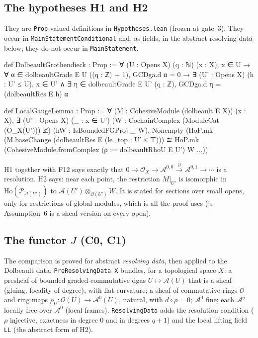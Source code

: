 \documentclass[11pt,a4paper]{article}
\newcommand{\code}[1]{\texttt{#1}}
\newcommand{\cA}{\mathcal{A}}
\newcommand{\Ocal}{\mathcal{O}}
\newcommand{\dbar}{\bar\partial}
\newcommand{\Ho}{\mathrm{Ho}}
\begin{document}
\subsection{The hypotheses H1 and H2}\label{sec:hyp}
They are \code{Prop}-valued definitions in \code{Hypotheses.lean} (frozen at gate~3). They occur
in \code{MainStatementConditional} and, as fields, in the abstract resolving data below; they do
not occur in \code{MainStatement}.
\begin{lean}
def DolbeaultGrothendieck : Prop :=
  ∀ (U : Opens X) (q : ℕ) (x : X), x ∈ U →
    ∀ α ∈ dolbeaultGrade E U ((q : ℤ) + 1), GCDga.d α = 0 →
      ∃ (U' : Opens X) (h : U' ≤ U), x ∈ U' ∧
        ∃ η ∈ dolbeaultGrade E U' (q : ℤ), GCDga.d η = (dolbeaultRes E h) α

def LocalGaugeLemma : Prop :=
  ∀ (M : CohesiveModule (dolbeault E X)) (x : X),
    ∃ (U' : Opens X) (_ : x ∈ U')
      (W : CochainComplex (ModuleCat (O_X(U'))) ℤ) (hW : IsBoundedFGProj _ W),
      Nonempty (HoP.mk (M.baseChange (dolbeaultRes E (le_top : U' ≤ ⊤))) ≅
                HoP.mk (CohesiveModule.fromComplex (ρ := dolbeaultRhoU E U') W ...))
\end{lean}
H1 together with F12 says exactly that $0\to\Ocal_X\to\cA^{0,0}\xrightarrow{\dbar}\cA^{0,1}\to\cdots$ is
a resolution. H2 says: near each point, the restriction $M|_{U'}$ is isomorphic in
$\Ho(\mathcal P_{\cA(U')})$ to $\cA(U')\otimes_{\Ocal(U')}W$. It is stated for sections over
small opens, only for restrictions of global modules, which is all the proof uses (\cite{A}'s
Assumption~6 is a sheaf version on every open).

\subsection{\texorpdfstring{The functor $J$ (C0, C1)}{The functor J (C0, C1)}}\label{sec:J}
The comparison is proved for abstract \emph{resolving data}, then applied to the Dolbeault data.
\code{PreResolvingData X} bundles, for a topological space $X$: a presheaf of bounded
graded-commutative dgas $U\mapsto\cA(U)$ that is a sheaf (gluing, locality of degree), with flat
curvature; a sheaf of commutative rings $\Ocal$ and ring maps $\rho_U\colon\Ocal(U)\to\cA^0(U)$,
natural, with $d\circ\rho=0$; $\cA^0$ fine; each $\cA^q$ locally free over $\cA^0$ (local frames).
\code{ResolvingData} adds the resolution condition ($\rho$ injective, exactness in degree $0$ and
in degrees $q+1$) and the local lifting field \code{LL} (the abstract form of H2).
\end{document}
